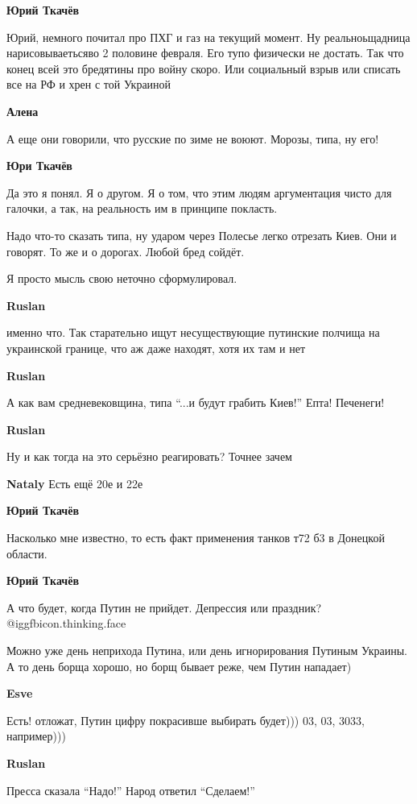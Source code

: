 \begin{itemize}
\textbf{Юрий Ткачёв}

Юрий, немного почитал про ПХГ и газ на текущий момент. Ну реальноьщадница
нарисовываетьсяво 2 половине февраля. Его тупо физически не достать. Так что
конец всей это бредятины про войну скоро. Или социальный взрыв или списать все
на РФ и хрен с той Украиной

\textbf{Алена}

А еще они говорили, что русские по зиме не воюют. Морозы, типа, ну его!

\textbf{Юри Ткачёв}

Да это я понял. Я о другом. Я о том, что этим людям аргументация чисто для
галочки, а так, на реальность им в принципе покласть. 

Надо что-то сказать типа, ну ударом через Полесье легко отрезать Киев. Они и
говорят. То же и о дорогах. Любой бред сойдёт. 

Я просто мысль свою неточно сформулировал.

\textbf{Ruslan}

именно что. Так старательно ищут несуществующие путинские полчища на украинской
границе, что аж даже находят, хотя их там и нет

\textbf{Ruslan}

А как вам средневековщина, типа \enquote{...и будут грабить Киев!} Епта!
Печенеги!

\textbf{Ruslan}

Ну и как тогда на это серьёзно реагировать? Точнее зачем

\textbf{Nataly}
Есть ещё 20е и 22е

\textbf{Юрий Ткачёв}

Насколько мне известно, то есть факт применения танков т72 б3 в Донецкой
области.

\textbf{Юрий Ткачёв}

А что будет, когда Путин не прийдет. Депрессия или праздник?
@igg{fbicon.thinking.face} 

Можно уже день неприхода Путина, или день игнорирования Путиным Украины. А то
день борща хорошо, но борщ бывает реже, чем Путин нападает)

\textbf{Esve}

Есть! отложат, Путин цифру покрасивше выбирать будет))) 03, 03, 3033, например)))

\textbf{Ruslan}

Пресса сказала \enquote{Надо!}
Народ ответил \enquote{Сделаем!}


\end{itemize}
